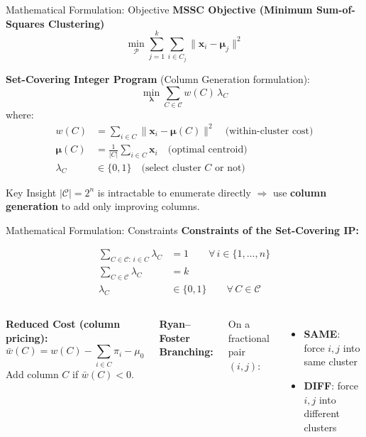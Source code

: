 \documentclass[aspectratio=169,12pt]{beamer}
\begin{document}
\begin{frame}{Mathematical Formulation: Objective}
  \textbf{MSSC Objective (Minimum Sum-of-Squares Clustering)}
  \[
    \min_{\mathcal{P}} \sum_{j=1}^{k} \sum_{i \in C_j} \|\mathbf{x}_i - \boldsymbol{\mu}_j\|^2
  \]

  \vspace{0.5em}
  \textbf{Set-Covering Integer Program} (Column Generation formulation):
  \[
    \min_{\boldsymbol{\lambda}} \sum_{C \in \mathcal{C}} w(C)\,\lambda_C
  \]
  where:
  \begin{align*}
    w(C) &= \sum_{i \in C}\|\mathbf{x}_i - \boldsymbol{\mu}(C)\|^2 \quad \text{(within-cluster cost)} \\
    \boldsymbol{\mu}(C) &= \frac{1}{|C|}\sum_{i \in C}\mathbf{x}_i \quad \text{(optimal centroid)} \\
    \lambda_C &\in \{0,1\} \quad \text{(select cluster } C \text{ or not)}
  \end{align*}

  \vspace{0.2em}
  \begin{alertblock}{Key Insight}
    $|\mathcal{C}| = 2^n$ is intractable to enumerate directly $\Rightarrow$ use \textbf{column generation} to add only improving columns.
  \end{alertblock}
\end{frame}

\begin{frame}{Mathematical Formulation: Constraints}
  \textbf{Constraints of the Set-Covering IP:}

  \vspace{0.3em}
  \begin{align}
    \sum_{C \in \mathcal{C}:\, i \in C} \lambda_C &= 1 \qquad \forall\, i \in \{1,\ldots,n\}
      \tag{Coverage} \\[6pt]
    \sum_{C \in \mathcal{C}} \lambda_C &= k
      \tag{Cardinality} \\[6pt]
    \lambda_C &\in \{0,1\} \qquad \forall\, C \in \mathcal{C}
      \tag{Integrality}
  \end{align}

  \vspace{0.3em}
  \begin{columns}[T]
      \textbf{Reduced Cost (column pricing):}
      \[
        \bar{w}(C) = w(C) - \sum_{i \in C}\pi_i - \mu_0
      \]
      Add column $C$ if $\bar{w}(C) < 0$.

      \textbf{Ryan--Foster Branching:}

      On a fractional pair $(i,j)$:
      \begin{itemize}
        \item \textbf{SAME}: force $i,j$ into same cluster
        \item \textbf{DIFF}: force $i,j$ into different clusters
      \end{itemize}
  \end{columns}
\end{frame}
\end{document}
